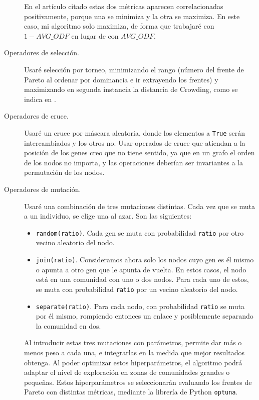 \begin{description}
    En el artículo citado estas dos métricas aparecen correlacionadas positivamente,
    porque una se minimiza y la otra se maximiza. En este caso, mi algoritmo solo maximiza,
    de forma que trabajaré con \(1 - AVG\_ODF\) en lugar de con \(AVG\_ODF\).

  \item[Operadores de selección.] Usaré selección por torneo, minimizando el rango (número
    del frente de Pareto al ordenar por dominancia e ir extrayendo los frentes) y maximizando
    en segunda instancia la distancia de Crowding, como se indica en \cite{deb2002fastelitist}.

  \item[Operadores de cruce.] Usaré un cruce por máscara aleatoria, donde los elementos
    a \lstinline{True} serán intercambiados y los otros no. Usar operados de cruce que
    atiendan a la posición de los genes creo que no tiene sentido, ya que en un grafo el
    orden de los nodos no importa, y las operaciones deberían ser invariantes a la
    permutación de los nodos.

  \item[Operadores de mutación.] Usaré una combinación de tres mutaciones distintas. Cada
    vez que se muta a un individuo, se elige una al azar. Son las siguientes:
    \begin{itemize}
      \item \lstinline{random(ratio)}. Cada gen se muta con probabilidad
        \lstinline{ratio} por otro vecino aleatorio del nodo.

      \item \lstinline{join(ratio)}. Consideramos ahora solo los nodos cuyo gen
        es él mismo o apunta a otro gen que le apunta de vuelta. En estos casos,
        el nodo está en una comunidad con uno o dos nodos. Para cada uno
        de estos, se muta con probabilidad \lstinline{ratio} por un vecino
        aleatorio del nodo.

      \item \lstinline{separate(ratio)}. Para cada nodo, con probabilidad
        \lstinline{ratio} se muta por él mismo, rompiendo entonces un enlace
        y posiblemente separando la comunidad en dos.
    \end{itemize}

    Al introducir estas tres mutaciones con parámetros, permite dar más o menos
    peso a cada una, e integrarlas en la medida que mejor resultados obtenga.
    Al poder optimizar estos hiperparámetros, el algoritmo podrá adaptar el
    nivel de exploración en zonas de comunidades grandes o pequeñas. Estos
    hiperparámetros se seleccionarán evaluando los frentes de Pareto con
    distintas métricas, mediante la librería de Python \lstinline{optuna}.
\end{description}


